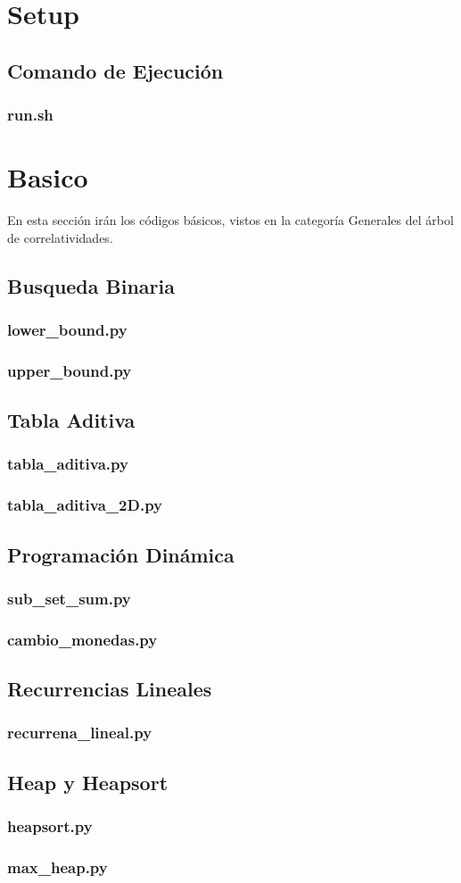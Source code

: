 \documentclass{article}
\newcommand\codefile[2]{    
    \subsubsection{#2}
    
    
}
\begin{document}
\begin{multicols*}{2}

\tableofcontents

\section{Setup}

\subsection{Comando de Ejecución}

\codefile{utilitarios/run.sh}{run.sh}

\section{Basico}
En esta sección irán los códigos básicos, vistos en la categoría Generales del árbol de correlatividades.

\subsection{Busqueda Binaria}
\codefile{basicos/lower_bound.py}{lower\_bound.py}
\codefile{basicos/upper_bound.py}{upper\_bound.py}

\subsection{Tabla Aditiva}
\codefile{basicos/tabla_aditiva.py}{tabla\_aditiva.py}
\codefile{basicos/tabla_aditiva_2D.py}{tabla\_aditiva\_2D.py}

\subsection{Programación Dinámica}
\codefile{basicos/sub_set_sum.py}{sub\_set\_sum.py}
\codefile{basicos/cambio_monedas.py}{cambio\_monedas.py}

\subsection{Recurrencias Lineales}
\codefile{basicos/recurrencia_lineal.py}{recurrena\_lineal.py}

\subsection{Heap y Heapsort}
\codefile{basicos/heapsort.py}{heapsort.py}
\codefile{basicos/max_heap.py}{max\_heap.py}


\end{multicols*}
\end{document}
